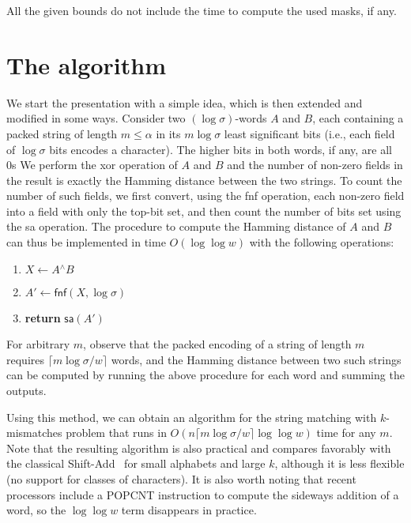 \documentclass{llncs}
\newcommand{\ceil}[1]{\lceil #1 \rceil}
\def \bxor{\textsf{xor}\xspace}
\newcommand{\uxor}{\mathrel{^\wedge}}
\newcommand{\word}[1]{#1}
\newcommand{\fword}[1]{$(#1)$-word}
\begin{document}
All the given bounds do not include the time to compute the used masks, if any.

\section{The algorithm}
\label{sec:the_algorithm}


\noindent
We start the presentation with a simple idea, which is then extended
and modified in some ways. Consider two
\fword{\log\sigma}s $\word{A}$ and $\word{B}$, each containing a
packed string of length $m\le \alpha$ in its $m\log\sigma$ least significant
bits (i.e., each field of $\log\sigma$ bits encodes a character). The
higher bits in both words, if any, are all 0s
We perform the \bxor operation of $\word{A}$ and $\word{B}$ and the
number of non-zero fields in the result is exactly the Hamming
distance between the two strings. To count the number of such fields,
we first convert, using the \textsf{fnf} operation, each non-zero
field into a field with only the top-bit set, and then count the number
of bits set using the \textsf{sa} operation.
The procedure to compute the Hamming distance of $\word{A}$ and
$\word{B}$ can thus be implemented in time $O(\log\log w)$ with the
following operations:
\begin{enumerate}
\item $\word{X}\leftarrow \word{A} \uxor \word{B}$
\item $\word{A'}\leftarrow \textsf{fnf}(\word{X}, \log\sigma)$
\item \textbf{return} $\textsf{sa}(\word{A'})$
\end{enumerate}
For arbitrary $m$, observe that the packed encoding of a string of
length $m$ requires $\ceil{m\log\sigma / w}$ words, and the Hamming
distance between two such strings can be computed by running the above
procedure for each word and summing the outputs.

Using this method, we can obtain an algorithm for the string matching
with $k$-mismatches problem that runs in $O(n \ceil{m\log \sigma /
  w}\log\log w)$ time for any $m$. Note that the resulting algorithm
is also practical and compares favorably with the classical Shift-Add~\cite{DBLP:journals/cacm/Baeza-YatesG92}
for small alphabets
and large $k$, although it is less flexible (no support for classes of
characters). It is also worth noting that recent processors include a
\textsc{POPCNT} instruction to compute the sideways addition of a
word, so the $\log\log w$ term disappears in practice.
\end{document}
